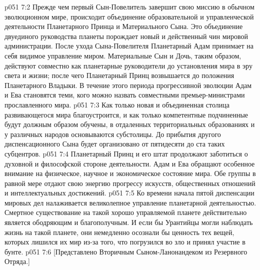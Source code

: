 \vs p051 7:2 Прежде чем первый Сын\hyp{}Повелитель завершит свою миссию в обычном эволюционном мире, происходит объединение образовательной и управленческой деятельности Планетарного Принца и Материального Сына. Это объединение двуединого руководства планеты порождает новый и действенный чин мировой администрации. После ухода Сына\hyp{}Повелителя Планетарный Адам принимает на себя видимое управление миром. Материальные Сын и Дочь, таким образом, действуют совместно как планетарные руководители до установления мира в эру света и жизни; после чего Планетарный Принц возвышается до положения Планетарного Владыки. В течение этого периода прогрессивной эволюции Адам и Ева становятся теми, кого можно назвать совместными премьер\hyp{}министрами прославленного мира.
\vs p051 7:3 Как только новая и объединенная столица развивающегося мира благоустроится, и как только компетентные подчиненные будут должным образом обучены, в отдаленных территориальных образованиях и у различных народов основываются субстолицы. До прибытия другого диспенсационного Сына будет организовано от пятидесяти до ста таких субцентров.
\vs p051 7:4 Планетарный Принц и его штат продолжают заботиться о духовной и философской стороне деятельности. Адам и Ева обращают особенное внимание на физическое, научное и экономическое состояние мира. Обе группы в равной мере отдают свою энергию прогрессу искусств, общественных отношений и интеллектуальных достижений.
\vs p051 7:5 Ко времени начала пятой диспенсации мировых дел налаживается великолепное управление планетарной деятельностью. Смертное существование на такой хорошо управляемой планете действительно является ободряющим и благополучным. И если бы Урантийцы могли наблюдать жизнь на такой планете, они немедленно осознали бы ценность тех вещей, которых лишился их мир из\hyp{}за того, что погрузился во зло и принял участие в бунте.
\vsetoff
\vs p051 7:6 [Представлено Вторичным Сыном\hyp{}Ланонандеком из Резервного Отряда.]
